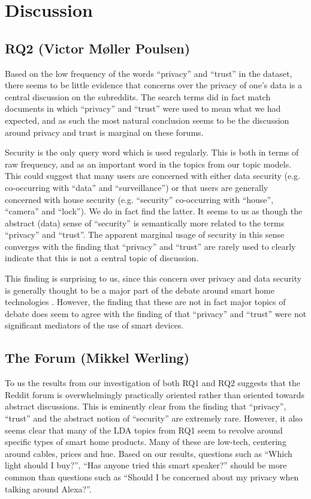 \documentclass{article}
\begin{document}
    \section{Discussion}
    \subsection{RQ2 (Victor Møller Poulsen)}
    Based on the low frequency of the words “privacy” and “trust” in the dataset, there seems to be little evidence that concerns over the privacy of one's data is a central discussion on the subreddits. The search terms did in fact match documents in which “privacy” and “trust” were used to mean what we had expected, and as such the most natural conclusion seems to be the discussion around privacy and trust is marginal on these forums. 

    Security is the only query word which is used regularly. This is both in terms of raw frequency, and as an important word in the topics from our topic models. This could suggest that many users are concerned with either data security (e.g. co-occurring with “data” and “surveillance”) or that users are generally concerned with house security (e.g. “security” co-occurring with “house”, “camera” and “lock”). We do in fact find the latter. It seems to us as though the abstract (data) sense of “security” is semantically more related to the terms “privacy” and “trust”. The apparent marginal usage of security in this sense converges with the finding that “privacy” and “trust” are rarely used to clearly indicate that this is not a central topic of discussion. 

    This finding is surprising to us, since this concern over privacy and data security is generally thought to be a major part of the debate around smart home technologies \cite{hubert2020take,tabassum2019investigating}. However, the finding that these are not in fact major topics of debate does seem to agree with the finding of  that “privacy” and “trust” were not significant mediators of the use of smart devices. 

    \subsection{The Forum (Mikkel Werling)}
    To us the results from our investigation of both RQ1 and RQ2 suggests that the Reddit forum is overwhelmingly practically oriented rather than oriented towards abstract discussions. This is eminently clear from the finding that “privacy”, “trust” and the abstract notion of “security” are extremely rare. However, it also seems clear that many of the LDA topics from RQ1 seem to revolve around specific types of smart home products. Many of these are low-tech, centering around cables, prices and hue. Based on our results, questions such as “Which light should I buy?”, “Has anyone tried this smart speaker?” should be more common than questions such as “Should I be concerned about my privacy when talking around Alexa?”. 
\end{document}
